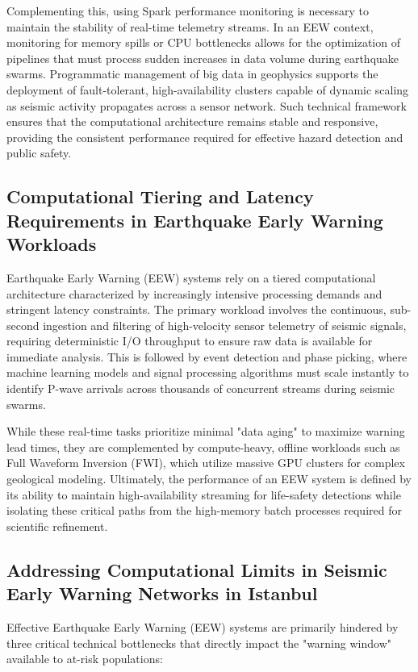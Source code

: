 \documentclass[data,article,submit,pdftex,moreauthors]{Definitions/mdpi}
\begin{document}
Complementing this, using Spark performance monitoring is necessary to maintain the stability of real-time telemetry streams. In an EEW context, monitoring for memory spills or CPU bottlenecks allows for the optimization of pipelines that must process sudden increases in data volume during earthquake swarms. Programmatic management of big data in geophysics supports the deployment of fault-tolerant, high-availability clusters capable of dynamic scaling as seismic activity propagates across a sensor network. Such technical framework ensures that the computational architecture remains stable and responsive, providing the consistent performance required for effective hazard detection and public safety.

\subsection{Computational Tiering and Latency Requirements in Earthquake Early Warning Workloads}

Earthquake Early Warning (EEW) systems rely on a tiered computational architecture characterized by increasingly intensive processing demands and stringent latency constraints. The primary workload involves the continuous, sub-second ingestion and filtering of high-velocity sensor telemetry of seismic signals, requiring deterministic I/O throughput to ensure raw data is available for immediate analysis. This is followed by event detection and phase picking, where machine learning models and signal processing algorithms must scale instantly to identify P-wave arrivals across thousands of concurrent streams during seismic swarms. 

While these real-time tasks prioritize minimal "data aging" to maximize warning lead times, they are complemented by compute-heavy, offline workloads such as Full Waveform Inversion (FWI), which utilize massive GPU clusters for complex geological modeling. Ultimately, the performance of an EEW system is defined by its ability to maintain high-availability streaming for life-safety detections while isolating these critical paths from the high-memory batch processes required for scientific refinement.

\subsection{Addressing Computational Limits in Seismic Early Warning Networks in Istanbul}

Effective Earthquake Early Warning (EEW) systems are primarily hindered by three critical technical bottlenecks that directly impact the "warning window" available to at-risk populations:
\end{document}
